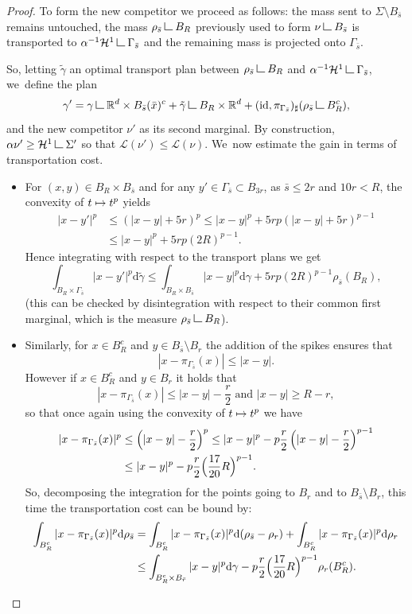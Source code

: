 \documentclass[11pt]{article}
\numberwithin{equation}{section}
\newcommand\mto{\mathchoice{\longmapsto}{\mapsto}{\mapsto}{\mapsto}}
\theoremstyle{definition}
\newcommand\LM[1]{\hbox{\vrule width.5pt \vbox to#1pt{\vfill \hrule width#1pt height.5pt}}}
\newcommand\LL{{\mathchoice {\>\LM7\>}{\>\LM7\>}{\,\LM5\,}{\,\LM{3.35}\,}}}
\newcommand{\mres}{\LL}
\newcommand\cH{\mathcal{H}}
\newcommand{\RR}{\mathbb{R}}
\newcommand\dd{\mathrm{d}}
\begin{document}
\begin{proof}
To form the new competitor we proceed as follows: the mass sent to $\Sigma\setminus B_{\bar s}$ remains untouched, the mass $\rho_{\bar s}\mres B_R$ previously used to form $\nu\mres B_{\bar s}$ is transported to $\alpha^{-1}\cH^1\mres \Gamma_{\bar s}$ and the remaining mass is projected onto $\Gamma_{\bar s}$.

So, letting $\tilde \gamma$ an optimal transport plan between $\rho_{\bar s}\mres B_R$ and $\alpha^{-1}\cH^1\mres \Gamma_{\bar s}$, we~define the plan
\[
\gamma' =
\gamma\mres \RR^d\times B_{\bar s}(\bar x)^c
+
\tilde \gamma\mres B_R\times\RR^d
+
(\text{id}, \pi_{\Gamma_{\bar s}})_\sharp(\rho_{\bar s}\mres B_R^c),
\]
and the new competitor $\nu'$ as its second marginal. By construction, $\alpha\nu' \ge \cH^1\mres \Sigma'$ so that $\mathcal{L}(\nu') \le \mathcal{L}(\nu)$. We~now estimate the gain in terms of transportation cost.
\begin{itemize}
\item For $(x,y)\in B_R\times B_{\bar s}$ and for any $y' \in \Gamma_{\bar s}\subset B_{3r}$, as $\bar s\le 2r$ and $10r < R$, the convexity of $t \mto t^p$ yields
\begin{align*}
|x - y'|^p
&\le
\left(|x - y| + 5r\right)^p
\le
|x - y|^p
+
5rp
\left(|x - y|+5r\right)^{p-1} \\
&\le
|x - y|^p
+
5rp {{\left(2R\right)^{p-1}}}.
\end{align*}
Hence integrating with respect to the transport plans we get
\[
\int_{B_R\times\Gamma_{\bar s}}|x - y'|^p \dd \tilde \gamma
\le
\int_{B_R\times B_{\bar s}}|x - y|^p \dd \gamma
+
5rp
\left({2R}\right)^{p-1}\rho_{\bar s}(B_R),
\]
(this can be checked by disintegration with respect to their common first marginal, which is the measure $\rho_{\bar s}\mres B_R$).
\item
Similarly, for $x \in B_R^c$ and $y \in B_{\bar s}\setminus B_r$ the addition of the spikes ensures that
\[
|x - \pi_{\Gamma_{\bar s}}(x)| \le |x - y|.
\]
However if $x \in B_R^c$ and $y \in B_r$ it holds that
\[
|x - \pi_{\Gamma_{\bar s}}(x)| \le |x - y| - \frac{r}{2}
\text{ and }
|x - y| \ge R - r,
\]
so that once again using the convexity of $t\mto t^p$ we have
\begin{align*}
|x - \pi_{\Gamma_{\bar s}}(x)|^p
&\le
\left(|x - y| -\frac{r}{2}\right)^p
\le
|x - y|^p
-
p\frac{r}{2}
\left(|x - y|-\frac{r}{2}\right)^{p-1}\\
&\le
|x - y|^p
-
p\frac{r}{2}
\Bigl(\frac{17}{20}R\Bigr)^{p-1}.
\end{align*}
So, decomposing the integration for the points going to $B_r$ and to $B_{\bar s}\setminus B_r$, this time the transportation cost can be bound by:
\begin{align*}
\int_{B_R^c}
|x - \pi_{\Gamma_{\bar s}}(x)|^p \dd \rho_{\bar s}
&=
\int_{B_R^c}
|x - \pi_{\Gamma_{\bar s}}(x)|^p \dd (\rho_{\bar s} -\rho_{r})
+
\int_{B_R^c}
|x - \pi_{\Gamma_{\bar s}}(x)|^p \dd \rho_{r}\\
&\le
\int_{B_R^c\times B_{\bar r}}|x - y|^p \dd \gamma
-
p\frac{r}{2}
\Bigl(\frac{17}{20}R\Bigr)^{p-1}\rho_r(B_R^c).
\end{align*}
\end{itemize}


\end{proof}
\end{document}

